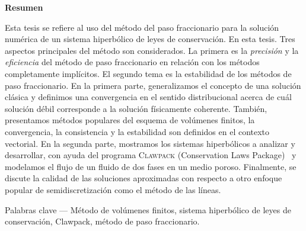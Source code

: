 \newpage
\begin{center}
	\fontsize{14}{17}\selectfont\bfseries Resumen
\end{center}
\noindent Esta tesis se refiere al uso del método del paso
fraccionario para la solución numérica de un sistema hiperbólico de
leyes de conservación.
En esta tesis.
Tres aspectos principales del método son considerados.
La primera es la \emph{precisión} y la \emph{eficiencia}
del método de paso fraccionario en relación con los métodos
completamente implícitos.
El segundo tema es la estabilidad de los métodos de paso fraccionario.
En la primera parte, generalizamos el concepto de una solución
clásica y definimos una convergencia en el sentido distribucional
acerca de cuál solución débil corresponde a la solución físicamente
coherente.
También, presentamos métodos populares del esquema de volúmenes
finitos, la convergencia, la consistencia y la estabilidad son
definidos en el contexto vectorial.
En la segunda parte, mostramos los sistemas hiperbólicos a analizar
y desarrollar, con ayuda del programa \textsc{Clawpack} (Conservation
Laws Package)~\cite{Clawpack2025,Mandli2016} y modelamos el flujo de
un fluido de dos fases en un medio poroso.
Finalmente, se discute la calidad de las soluciones aproximadas con
respecto a otro enfoque popular de semidiscretización como el método
de las líneas.

\noindent Palabras clave --- Método de volúmenes finitos, sistema
hiperbólico de leyes de conservación, Clawpack, método de paso
fraccionario.
